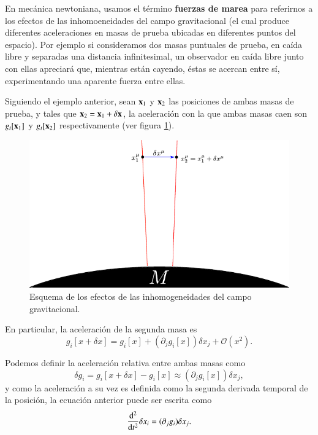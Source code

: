 En mecánica newtoniana, usamos el término \textbf{fuerzas de marea} para referirnos a los efectos de las inhomoeneidades del campo gravitacional (el cual produce diferentes aceleraciones en masas de prueba ubicadas en diferentes puntos del espacio). Por ejemplo si consideramos dos masas puntuales de prueba, en caída libre y separadas una distancia infinitesimal, un observador en caída libre junto con ellas apreciará que, mientras están cayendo, éstas se acercan entre sí, experimentando una aparente fuerza entre ellas.

Siguiendo el ejemplo anterior, sean $\vb{x}_1$ y $\vb{x}_2$ las posiciones de ambas masas de prueba, y tales que $\vb{x}_2 = \vb{x}_1 + \delta \vb{x}$, la aceleración con la que ambas masas caen son $g_i[\vb{x}_1]$ y $g_i[\vb{x}_2]$ respectivamente (ver figura \ref{fig:4}). 
\begin{figure}[h!]
\centering
\includegraphics[scale=1.2]{images/desvio.pdf}
\caption[Esquema de desvío]{Esquema de los efectos de las inhomogeneidades del campo gravitacional.}
\label{fig:4}
\end{figure}

En particular, la aceleración de la segunda masa es
\begin{equation}
g_i[x+\delta x] = g_i[x] + \left( \partial_j g_i[x] \right) \delta x_j + \mathcal{O}(x^2).
\end{equation}

Podemos definir la aceleración relativa entre ambas masas como
\begin{equation}
\delta g_i = g_i[x+\delta x] - g_i[x] \approx \left( \partial_j g_i[x] \right) \delta x_j,
\end{equation}
y como la aceleración a su vez es definida como la segunda derivada temporal de la posición, la ecuación anterior puede ser escrita como
\begin{equation}
\label{eq:122}
\dv[2]{ }{t} \delta x_i = (\partial_j g_i) \delta x_j.
\end{equation}

